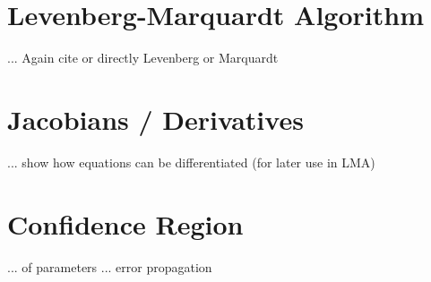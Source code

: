 
\section{Levenberg-Marquardt Algorithm}
... Again cite \cite{Seber} or directly Levenberg or Marquardt

\section{Jacobians / Derivatives}
... show how equations can be differentiated (for later use in LMA)

\section{Confidence Region}
... of parameters
... error propagation \cite{Siegwart}

